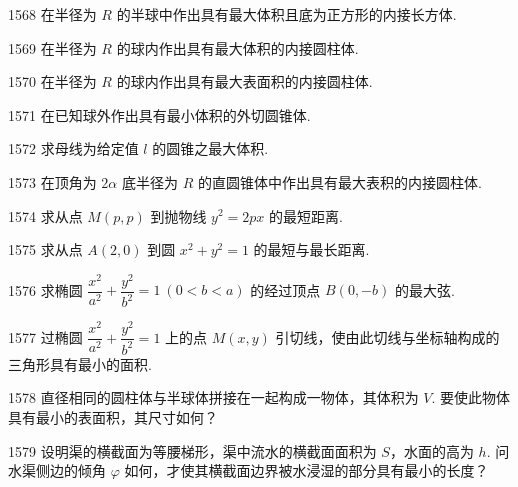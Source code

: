 \begin{prob}[M]{1568}
在半径为 $R$ 的半球中作出具有最大体积且底为正方形的内接长方体.
\end{prob}

\begin{prob}[M]{1569}
在半径为 $R$ 的球内作出具有最大体积的内接圆柱体.
\end{prob}

\begin{prob}[M]{1570}
在半径为 $R$ 的球内作出具有最大表面积的内接圆柱体.
\end{prob}

\begin{prob}[M]{1571}
在已知球外作出具有最小体积的外切圆锥体.
\end{prob}

\begin{prob}[M]{1572}
求母线为给定值 $l$ 的圆锥之最大体积.
\end{prob}

\begin{prob}[M]{1573}
在顶角为 $2\alpha$ 底半径为 $R$ 的直圆锥体中作出具有最大表积的内接圆柱体.
\end{prob}

\begin{prob}[M]{1574}
求从点 $M(p, p)$ 到抛物线 $y^2 = 2px$ 的最短距离.
\end{prob}

\begin{prob}[M]{1575}
求从点 $A(2, 0)$ 到圆 $x^2 + y^2 = 1$ 的最短与最长距离.
\end{prob}

\begin{prob}[M]{1576}
求椭圆 $\dfrac{x^2}{a^2} + \dfrac{y^2}{b^2} = 1\ (0 < b < a)$ 的经过顶点 $B(0, -b)$ 的最大弦.
\end{prob}

\begin{prob}[M]{1577}
过椭圆 $\dfrac{x^2}{a^2} + \dfrac{y^2}{b^2} = 1$ 上的点 $M(x, y)$ 引切线，使由此切线与坐标轴构成的三角形具有最小的面积.
\end{prob}

\begin{prob}[M]{1578}
直径相同的圆柱体与半球体拼接在一起构成一物体，其体积为 $V$. 要使此物体具有最小的表面积，其尺寸如何？
\end{prob}

\begin{prob}[M]{1579}
设明渠的横截面为等腰梯形，渠中流水的横截面面积为 $S$，水面的高为 $h$. 问水渠侧边的倾角 $\varphi$ 如何，才使其横截面边界被水浸湿的部分具有最小的长度？
\end{prob}

